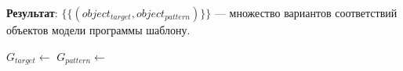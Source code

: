 \textbf{Результат}: $\{ \{ ( object_{target}, object_{pattern} ) \} \}$
--- множество вариантов соответствий объектов модели программы шаблону.

\begin{algorithmic}
    \State $G_{target} \gets$ 
    \State $G_{pattern} \gets$ 
    \State \Return {}
\EndFunction
\end{algorithmic}
